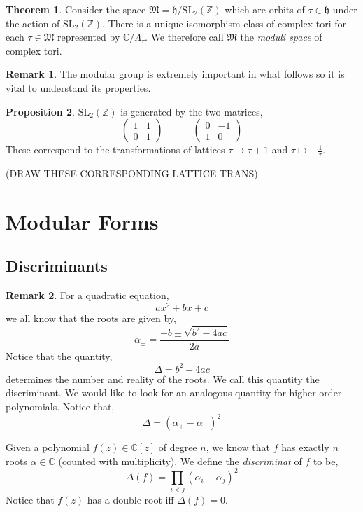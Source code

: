 \documentclass{article}
\newcommand{\SL}[0]{\mathrm{SL}}
\newcommand{\Z}{\mathbb{Z}}
\newcommand{\C}{\mathbb{C}}
\theoremstyle{definition}
\newtheorem{theorem}{Theorem}[section]
\newtheorem{proposition}[theorem]{Proposition}
\newtheorem{remark}{Remark}[section]
\newenvironment{definition}[1][Definition:]{\begin{trivlist}
\item[\hskip \labelsep {\bfseries #1}]}{\end{trivlist}}
\newcommand{\h}{\mathfrak{h}}
\newcommand{\MG}{\SL_2(\Z)}
\begin{document}
\begin{theorem}
Consider the space $\mathfrak{M} = \h / \MG$ which are orbits of $\tau \in \h$ under the action of $\MG$. There is a unique isomorphism class of complex tori for each $\tau \in \mathfrak{M}$ represented by $\C / \Lambda_\tau$. We therefore call $\mathfrak{M}$ the \textit{moduli space} of complex tori. 
\end{theorem}

\begin{remark}
The modular group is extremely important in what follows so it is vital to understand its properties. 
\end{remark}

\begin{proposition}
$\MG$ is generated by the two matrices,
\[ \begin{pmatrix}
1 & 1 
\\
0 & 1
\end{pmatrix}
\quad \quad \quad
\begin{pmatrix}
0 & -1 
\\
1 & 0
\end{pmatrix} \]
These correspond to the transformations of lattices $\tau \mapsto \tau + 1$ and $\tau \mapsto - \frac{1}{\tau}$. 
\end{proposition}  

{\color{red} (DRAW THESE CORRESPONDING LATTICE TRANS) }


\section{Modular Forms}

\subsection{Discriminants}

\begin{remark}
For a quadratic equation, 
\[ a x^2 + b x + c \]
we all know that the roots are given by,
\[ \alpha_{\pm} = \frac{-b \pm \sqrt{b^2 - 4 ac}}{2 a} \]
Notice that the quantity,
\[ \Delta = b^2 - 4 ac \]
determines the number and reality of the roots. We call this quantity the discriminant. We would like to look for an analogous quantity for higher-order polynomials. Notice that,
\[ \Delta = (\alpha_{+} - \alpha_{-})^2 \]
\end{remark}

\begin{definition}
Given a polynomial $f(z) \in \C[z]$ of degree $n$, we know that $f$ has exactly $n$ roots $\alpha \in \C$ (counted with multiplicity). We define the \textit{discriminat} of $f$ to be,
\[ \Delta(f) = \prod_{i < j} (\alpha_i - \alpha_j)^2 \]
Notice that $f(z)$ has a double root iff $\Delta(f) = 0$.
\end{definition}
\end{document}
